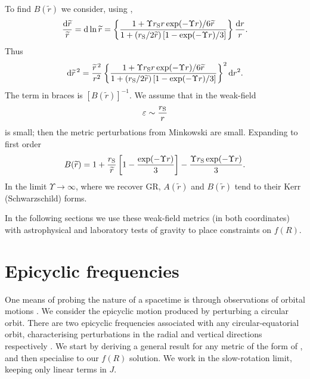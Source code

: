 To find $B(\widetilde{r})$ we consider, using ,
\begin{equation}
\frac{\mathrm{d} \widetilde{r}}{\widetilde{r}} =  \mathrm{d} \ln \widetilde{r} = \left\{\frac{1 + {\Upsilon r_\mathrm{S}r\exp(-\Upsilon r)}/{6\widetilde{r}}}{1 + ({r_\mathrm{S}}/{2\widetilde{r}})\left[1 - {\exp(-\Upsilon r)}/{3}\right]}\right\}\frac{\mathrm{d} r}{r}.
\end{equation}
Thus
\begin{equation}
\mathrm{d} \widetilde{r}^{\,2} = \frac{\widetilde{r}^{\,2}}{r^2}\left\{\frac{1 + {\Upsilon r_\mathrm{S}r\exp(-\Upsilon r)}/{6\widetilde{r}}}{1 + ({r_\mathrm{S}}/{2\widetilde{r}})\left[1 - {\exp(-\Upsilon r)}/{3}\right]}\right\}^2 \mathrm{d} r^2.
\end{equation}
The term in braces is $\left[B(\widetilde{r})\right]^{-1}$. We assume that in the weak-field
\begin{equation}
\varepsilon \sim \frac{r_\mathrm{S}}{r}
\end{equation}
is small; then the metric perturbations from Minkowski are small. Expanding to first order \citep{Olmo2007c}
\begin{equation}
B(\widetilde{r})  = 1 + \frac{r_\mathrm{S}}{\widetilde{r}}\left[1 - \frac{\exp(-\Upsilon r )}{3}\right] - \frac{\Upsilon r_\mathrm{S} \exp(-\Upsilon r)}{3}.
\label{eq:B_metric}
\end{equation}
In the limit $\Upsilon \rightarrow \infty$, where we recover GR, $A(\widetilde{r})$ and $B(\widetilde{r})$ tend to their Kerr (Schwarzschild) forms.

In the following sections we use these weak-field metrics (in both coordinates) with astrophysical and laboratory tests of gravity to place constraints on $f(R)$.

\section{Epicyclic frequencies\label{sec:Epicycle}}

One means of probing the nature of a spacetime is through observations of orbital motions \citep{Gair2008a}. We consider the epicyclic motion produced by perturbing a circular orbit. There are two epicyclic frequencies associated with any circular-equatorial orbit, characterising perturbations in the radial and vertical directions respectively \citep[section 3.2.3]{Binney2008}. We start by deriving a general result for any metric of the form of , and then specialise to our $f(R)$ solution. We work in the slow-rotation limit, keeping only linear terms in $J$.

